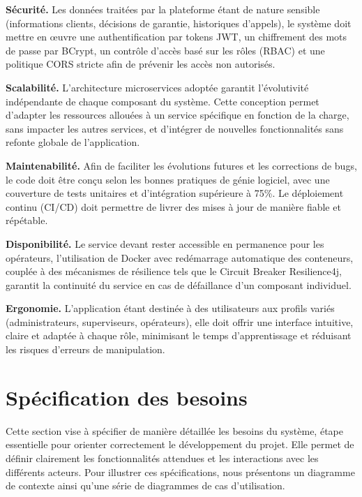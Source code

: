 \indent \textbf{S\'{e}curit\'{e}.} Les donn\'{e}es trait\'{e}es par la plateforme \'{e}tant de nature sensible (informations clients, d\'{e}cisions de garantie, historiques d'appels), le syst\`{e}me doit mettre en \oe uvre une authentification par tokens JWT, un chiffrement des mots de passe par BCrypt, un contr\^{o}le d'acc\`{e}s bas\'{e} sur les r\^{o}les (RBAC) et une politique CORS stricte afin de pr\'{e}venir les acc\`{e}s non autoris\'{e}s.

\indent \textbf{Scalabilit\'{e}.} L'architecture microservices adopt\'{e}e garantit l'\'{e}volutivit\'{e} ind\'{e}pendante de chaque composant du syst\`{e}me. Cette conception permet d'adapter les ressources allou\'{e}es \`{a} un service sp\'{e}cifique en fonction de la charge, sans impacter les autres services, et d'int\'{e}grer de nouvelles fonctionnalit\'{e}s sans refonte globale de l'application.

\indent \textbf{Maintenabilit\'{e}.} Afin de faciliter les \'{e}volutions futures et les corrections de bugs, le code doit \^{e}tre con\c{c}u selon les bonnes pratiques de g\'{e}nie logiciel, avec une couverture de tests unitaires et d'int\'{e}gration sup\'{e}rieure \`{a} 75\%. Le d\'{e}ploiement continu (CI/CD) doit permettre de livrer des mises \`{a} jour de mani\`{e}re fiable et r\'{e}p\'{e}table.

\indent \textbf{Disponibilit\'{e}.} Le service devant rester accessible en permanence pour les op\'{e}rateurs, l'utilisation de Docker avec red\'{e}marrage automatique des conteneurs, coupl\'{e}e \`{a} des m\'{e}canismes de r\'{e}silience tels que le Circuit Breaker Resilience4j, garantit la continuit\'{e} du service en cas de d\'{e}faillance d'un composant individuel.

\indent \textbf{Ergonomie.} L'application \'{e}tant destin\'{e}e \`{a} des utilisateurs aux profils vari\'{e}s (administrateurs, superviseurs, op\'{e}rateurs), elle doit offrir une interface intuitive, claire et adapt\'{e}e \`{a} chaque r\^{o}le, minimisant le temps d'apprentissage et r\'{e}duisant les risques d'erreurs de manipulation.



\section{Sp\'{e}cification des besoins}
\label{sec:specification}

Cette section vise \`{a} sp\'{e}cifier de mani\`{e}re d\'{e}taill\'{e}e les besoins du syst\`{e}me, \'{e}tape essentielle pour orienter correctement le d\'{e}veloppement du projet. Elle permet de d\'{e}finir clairement les fonctionnalit\'{e}s attendues et les interactions avec les diff\'{e}rents acteurs. Pour illustrer ces sp\'{e}cifications, nous pr\'{e}sentons un diagramme de contexte ainsi qu'une s\'{e}rie de diagrammes de cas d'utilisation.

